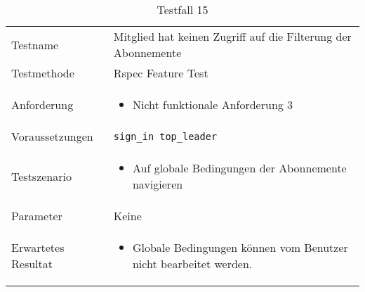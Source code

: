 \begin{table}[h!]
   \begin{tabular}{|L{0.4\textwidth}|L{0.6\textwidth}|}
       \hline
         \\[12pt]
       \hline
        Testname & Mitglied hat keinen Zugriff auf die Filterung der Abonnemente \\
       \hline
       Testmethode & Rspec Feature Test \\
       \hline
        Anforderung & 
        \begin{itemize}
         \item Nicht funktionale Anforderung 3
         \end{itemize}  \\
       \hline
       Voraussetzungen & \texttt{sign\_in top\_leader} \\
       \hline
       Testszenario & 
       \begin{itemize}
         \item Auf globale Bedingungen der Abonnemente navigieren
       \end{itemize} \\
       \hline
       Parameter & Keine \\
       \hline
       Erwartetes Resultat & 
       \begin{itemize}
         \item Globale Bedingungen können vom Benutzer nicht bearbeitet werden.
       \end{itemize} \\
     \hline
     \end{tabular}
     \caption{Testfall 15}
\end{table}

\newpage

